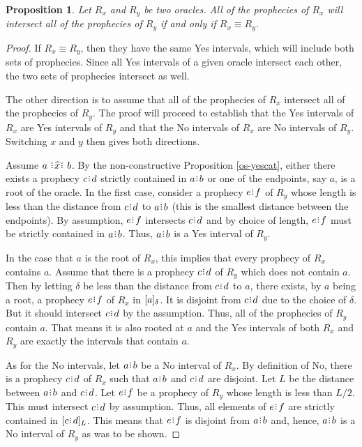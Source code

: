 \documentclass[12pt]{article}
\newtheorem{proposition}{Proposition}[section]
\begin{document}
 \begin{proposition}
Let $R_x$ and $R_y$ be two oracles. All of the prophecies of $R_x$ will intersect all of the prophecies of $R_y$ if and only if $R_x \equiv R_y$.
\end{proposition}

\begin{proof}\label{os-equal}
    If $R_x \equiv R_y$, then they have the same Yes intervals, which will include both sets of prophecies. Since all Yes intervals of a given oracle intersect each other, the two sets of prophecies intersect as well. 
    
    The other direction is to assume that all of the prophecies of $R_x$ intersect all of the prophecies of $R_y$. The proof will proceed to establish that the Yes intervals of $R_x$ are Yes intervals of $R_y$ and that the No intervals of $R_x$ are No intervals of $R_y$. Switching $x$ and $y$ then gives both directions.  

    Assume $a \xora b$. By the non-constructive Proposition \ref{os-yescat}, either there exists a prophecy $c\rint d$ strictly contained in $a\rint b$ or one of the endpoints, say $a$, is a root of the oracle. In the first case, consider a prophecy $e\rint f$ of $R_y$ whose length is less than the distance from $c\rint d$ to $a\rint b$ (this is the smallest distance between the endpoints). By assumption, $e\rint f$ intersects $c\rint d$ and by choice of length, $e\rint f$ must be strictly contained in $a\rint b$. Thus, $a\rint b$ is a Yes interval of $R_y$.

    In the case that $a$ is the root of $R_x$, this implies that every prophecy of $R_x$ contains $a$. Assume that there is a prophecy $c\rint d$ of $R_y$ which does not contain $a$. Then by letting $\delta$ be less than the distance from $c\rint d$ to $a$, there exists, by $a$ being a root, a prophecy $e\rint f$ of $R_x$ in $[a]_{\delta}$. It is disjoint from $c\rint d$ due to the choice of $\delta$. But it should intersect $c\rint d$ by the assumption. Thus, all of the prophecies of $R_y$ contain $a$. That means it is also rooted at $a$  and the Yes intervals of both $R_x$ and $R_y$ are exactly the intervals that contain $a$. 
    
    As for the No intervals, let $a\rint b$ be a No interval of $R_x$. By definition of No, there is a prophecy $c\rint d$ of $R_x$ such that $a\rint b$ and $c\rint d$ are disjoint. Let $L$ be the distance between $a\rint b$ and $c\rint d$. Let $e\rint f$ be a prophecy of $R_y$ whose length is less than $L/2$. This must intersect $c\rint d$ by assumption. Thus, all elements of $e\rint f$ are strictly contained in $\halo[L]{c\rint d}$. This means that $e\rint f$ is disjoint from $a\rint b$ and, hence, $a\rint b$ is a No interval of $R_y$ as was to be shown. 
\end{proof} 
\end{document}
